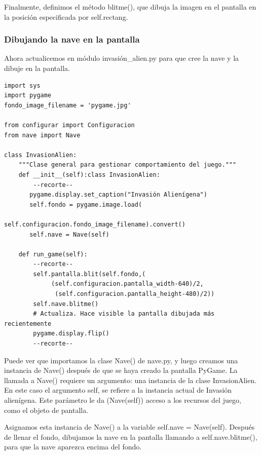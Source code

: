 Finalmente, definimos el método {\ttfamily  blitme()}, que dibuja la imagen en el pantalla en la posición especificada por {\ttfamily self.rectang}.


\subsubsection{Dibujando la nave en la pantalla}

Ahora actualicemos en módulo {\ttfamily invasión\_alien.py} para que cree la nave y la dibuje en la pantalla.


\hspace{-2.4cm}{\ttfamily \scriptsize invasión}

\vspace{-0.2cm}
\hspace{-2.1cm}{\ttfamily \scriptsize \_alien.py}\vspace{-0.84cm}
\begin{lstlisting}
import sys
import pygame
fondo_image_filename = 'pygame.jpg'

from configurar import Configuracion
from nave import Nave

class InvasionAlien:
    """Clase general para gestionar comportamiento del juego."""
    def __init__(self):class InvasionAlien:
        --recorte--
       pygame.display.set_caption("Invasión Alienígena")
       self.fondo = pygame.image.load(
                      self.configuracion.fondo_image_filename).convert()
       self.nave = Nave(self)
    
    def run_game(self):
        --recorte--
        self.pantalla.blit(self.fondo,(
             (self.configuracion.pantalla_width-640)/2,
              (self.configuracion.pantalla_height-480)/2))                      
        self.nave.blitme()
        # Actualiza. Hace visible la pantalla dibujada más recientemente
        pygame.display.flip()
        --recorte--	
\end{lstlisting}

Puede ver que importamos la clase {\ttfamily Nave()} de {\ttfamily nave.py}, y luego creamos una instancia de  {\ttfamily Nave()}
después de que se haya creado la pantalla PyGame. La llamada a {\ttfamily Nave()}  requiere un argumento: una instancia de la clase {\ttfamily InvasionAlien}. En este caso el argumento {\ttfamily self}, se refiere a la instancia actual de Invasión alienígena. Este  parámetro  le  da ({\ttfamily Nave(self)}) acceso a los recursos del juego, como el objeto de pantalla.

Asignamos esta instancia de  {\ttfamily Nave()}  a la variable {\ttfamily self.nave = Nave(self)}. 
Después de llenar el fondo, dibujamos la nave en la pantalla llamando a  {\ttfamily self.nave.blitme()}, para que la nave
aparezca encima del fondo. 

